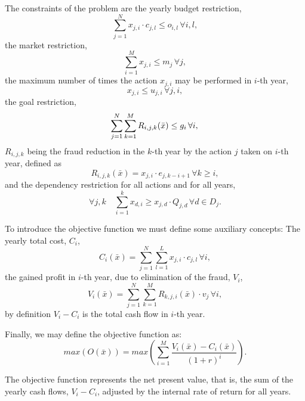 The constraints of the problem are the yearly budget restriction,
\begin{equation}
    \sum_{j=1}^{N} x_{j, i} \cdot c_{j,l} \le o_{i,l} \, \forall i, l,
	\label{eq:budget}
\end{equation}
the market restriction,
\begin{equation}
     \sum_{i=1}^{M} x_{j, i} \le m_j \, \forall j,
	\label{eq:market}
\end{equation}
the maximum number of times the action $x_{j, i}$ may be performed in $i$-th year,
\begin{equation}
     x_{j, i} \le u_{j, i} \, \forall j, i,
	\label{eq:maxacts}
\end{equation}
the goal restriction,
\begin{equation}
    \label{eq:goal}
    \sum_{j=1}^{N} \sum_{k=1}^{M}R_{i,j,k}(\bar{x}) \leq g_i \, \forall i, \\
\end{equation}
$R_{i,j,k}$ being the fraud reduction in the $k$-th year by the action $j$ taken on $i$-th year, defined as
\begin{equation}
    \label{eq:rec}
    R_{i,j,k}(\bar{x}) = x_{j, i} \cdot e_{j, k - i + 1} \, \forall k \geq i,
\end{equation}
and the dependency restriction for all actions and for all years,
\begin{equation}
    \label{eq:dependency}
    \forall j,k \quad \sum_{i=1}^{k} x_{d, i} \ge x_{j, d} \cdot Q_{j, d} \, \forall d \in D_j.
\end{equation}

To introduce the objective function we must define some auxiliary concepts:
The yearly total cost, $C_i$,
\begin{equation}
\label{eq:cost}
C_{i}(\bar{x}) =  \sum_{j=1}^{N} \sum_{l=1}^{L} x_{j, i} \cdot c_{j,l} \, \forall i,
\end{equation}
the gained profit in $i$-th year, due to elimination of the fraud, $V_i$,
\begin{equation}
    V_{i}(\bar{x}) = \sum_{j=1}^{N} \sum_{k=1}^{M} R_{k, j, i}(\bar{x}) \cdot v_j \, \forall i,
\end{equation}
by definition $V_i - C_i$ is the total cash flow in $i$-th year. 

Finally, we may define the objective function as:
\begin{equation}
    \label{eq:objective}
    max(O(\bar{x})) = max\left(\sum_{i=1}^{M} \frac{V_i(\bar{x}) - C_i(\bar{x})}{(1+r)^i}\right).
\end{equation}

The objective function represents the net present value, that is,
the sum of the yearly cash flows, $V_i - C_i$, adjusted by the internal rate of return for all years.


